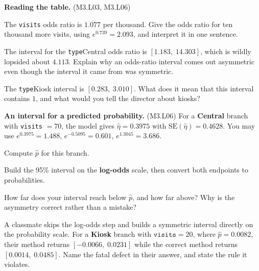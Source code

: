 \documentclass[11pt]{article}
\newcommand{\answerspace}[1]{\vspace{#1}}
\newcommand{\lo}[1]{{\normalfont\small (#1)}}
\begin{document}
\begin{questions}

\item \textbf{Reading the table.} \lo{M3.L03, M3.L06}

\begin{parts}
\item The \texttt{visits} odds ratio is $1.077$ per thousand. Give the odds ratio for ten thousand
more visits, using $e^{0.739} = 2.093$, and interpret it in one sentence.
\answerspace{4em}

\item The interval for the \texttt{type}Central odds ratio is $[1.183,\; 14.303]$, which is wildly
lopsided about $4.113$. Explain why an odds-ratio interval comes out asymmetric even though the
interval it came from was symmetric.
\answerspace{4em}

\item The \texttt{type}Kiosk interval is $[0.283,\; 3.010]$. What does it mean that this interval
contains $1$, and what would you tell the director about kiosks?
\answerspace{4em}
\end{parts}

\item \textbf{An interval for a predicted probability.} \lo{M3.L06} For a \textbf{Central} branch
with \texttt{visits} $= 70$, the model gives $\hat\eta = 0.3975$ with
$\text{SE}(\hat\eta) = 0.4628$. You may use $e^{0.3975} = 1.488$, \; $e^{-0.5095} = 0.601$, \;
$e^{1.3045} = 3.686$.

\begin{parts}
\item Compute $\hat{p}$ for this branch.
\answerspace{3em}

\item Build the 95\% interval on the \textbf{log-odds} scale, then convert both endpoints to
probabilities.
\answerspace{5em}

\item How far does your interval reach below $\hat{p}$, and how far above? Why is the asymmetry
correct rather than a mistake?
\answerspace{4em}

\item A classmate skips the log-odds step and builds a symmetric interval directly on the
probability scale. For a \textbf{Kiosk} branch with $\texttt{visits} = 20$, where
$\hat{p} = 0.0082$, their method returns $[-0.0066,\; 0.0231]$ while the correct method returns
$[0.0014,\; 0.0485]$. Name the fatal defect in their answer, and state the rule it violates.
\answerspace{4.5em}
\end{parts}


\end{questions}
\end{document}
